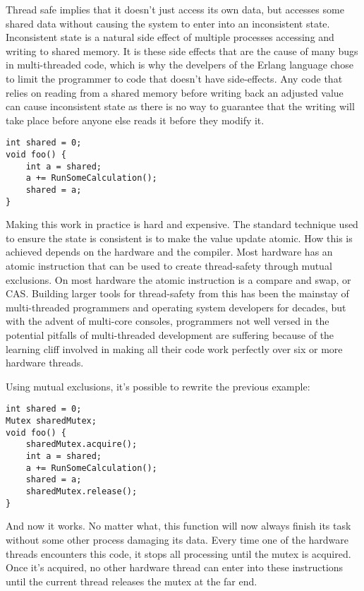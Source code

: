 Thread safe implies that it doesn't just access its own data, but accesses some
shared data without causing the system to enter into an inconsistent state.
Inconsistent state is a natural side effect of multiple processes accessing and
writing to shared memory. It is these side effects that are the cause of many
bugs in multi-threaded code, which is why the develpers of the Erlang language
chose to limit the programmer to code that doesn't have side-effects.  Any code
that relies on reading from a shared memory before writing back an adjusted
value can cause inconsistent state as there is no way to guarantee that the
writing will take place before anyone else reads it before they modify it.

\begin{verbatim}
int shared = 0;
void foo() {
	int a = shared;
	a += RunSomeCalculation();
	shared = a;
}
\end{verbatim}

Making this work in practice is hard and expensive. The standard technique used
to ensure the state is consistent is to make the value update atomic. How this
is achieved depends on the hardware and the compiler. Most hardware has an
atomic instruction that can be used to create thread-safety through mutual
exclusions. On most hardware the atomic instruction is a compare and swap, or
CAS. Building larger tools for thread-safety from this has been the mainstay of
multi-threaded programmers and operating system developers for decades, but
with the advent of multi-core consoles, programmers not well versed in the
potential pitfalls of multi-threaded development are suffering because of the
learning cliff involved in making all their code work perfectly over six or
more hardware threads.

Using mutual exclusions, it's possible to rewrite the previous example:

\begin{verbatim}
int shared = 0;
Mutex sharedMutex;
void foo() {
	sharedMutex.acquire();
	int a = shared;
	a += RunSomeCalculation();
	shared = a;
	sharedMutex.release();
}
\end{verbatim}

And now it works. No matter what, this function will now always finish its
task without some other process damaging its data. Every time one of the
hardware threads encounters this code, it stops all processing until the mutex
is acquired. Once it's acquired, no other hardware thread can enter into these
instructions until the current thread releases the mutex at the far end.

